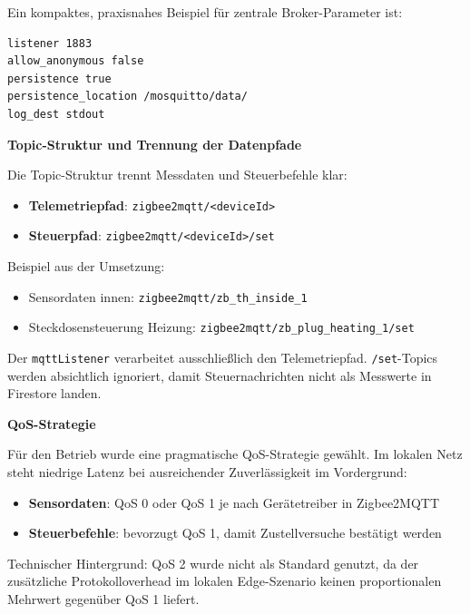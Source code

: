 Ein kompaktes, praxisnahes Beispiel für zentrale Broker-Parameter ist:

\begin{lstlisting}[language=bash,caption={Beispielhafter Mosquitto-Basissatz für den Containerbetrieb},label={lst:mosquitto_basic_config},basicstyle=\ttfamily\small]
listener 1883
allow_anonymous false
persistence true
persistence_location /mosquitto/data/
log_dest stdout
\end{lstlisting}

\textbf{Topic-Struktur und Trennung der Datenpfade}

Die Topic-Struktur trennt Messdaten und Steuerbefehle klar:

\begin{itemize}
    \item \textbf{Telemetriepfad}: \texttt{zigbee2mqtt/<deviceId>}
    \item \textbf{Steuerpfad}: \texttt{zigbee2mqtt/<deviceId>/set}
\end{itemize}

Beispiel aus der Umsetzung:

\begin{itemize}
    \item Sensordaten innen: \texttt{zigbee2mqtt/zb\_th\_inside\_1}
    \item Steckdosensteuerung Heizung: \texttt{zigbee2mqtt/zb\_plug\_heating\_1/set}
\end{itemize}

Der \texttt{mqttListener} verarbeitet ausschließlich den Telemetriepfad. \texttt{/set}-Topics werden absichtlich ignoriert, damit Steuernachrichten nicht als Messwerte in Firestore landen.

\textbf{QoS-Strategie}

Für den Betrieb wurde eine pragmatische QoS-Strategie gewählt. Im lokalen Netz steht niedrige Latenz bei ausreichender Zuverlässigkeit im Vordergrund:

\begin{itemize}
    \item \textbf{Sensordaten}: QoS 0 oder QoS 1 je nach Gerätetreiber in Zigbee2MQTT
    \item \textbf{Steuerbefehle}: bevorzugt QoS 1, damit Zustellversuche bestätigt werden
\end{itemize}

Technischer Hintergrund: QoS 2 wurde nicht als Standard genutzt, da der zusätzliche Protokolloverhead im lokalen Edge-Szenario keinen proportionalen Mehrwert gegenüber QoS 1 liefert.

